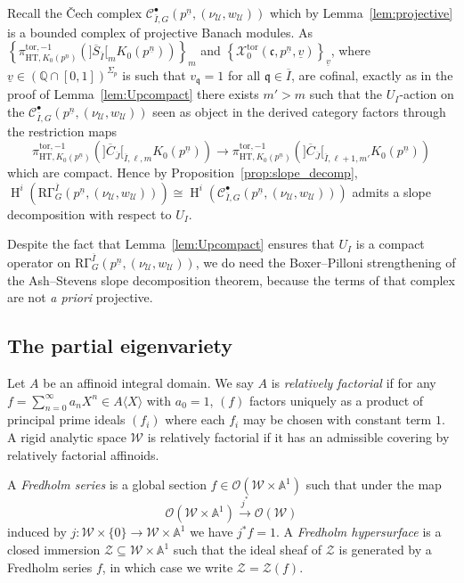 \documentclass[11pt]{amsart}
\theoremstyle{definition} %
\theoremstyle{plain} %
\theoremstyle{remark} %
\renewcommand{\AA}{\mathbb A}
\newcommand{\QQ}{{\mathbb Q}}
\newcommand{\cC}{{\mathcal C}}
\newcommand{\cO}{{\mathcal O}}
\newcommand{\cU}{{\mathcal U}}
\newcommand{\cX}{{\mathcal X}}
\newcommand{\cZ}{{\mathcal Z}}
\newcommand{\frakc}{\mathfrak c}
\newcommand{\frakq}{\mathfrak q}
\newcommand{\sW}{\mathscr W}
\newcommand{\HT}{\mathrm{HT}}
\newcommand{\isom}{\cong} %
\newcommand{\tor}{\mathrm{tor}} %
\newcommand{\RG}{\mathrm{R\Gamma}}
\DeclareMathOperator\rH{H}
\begin{document}
 Recall the \v{C}ech complex $\cC_{\overline{I},G}^{\bullet}(p^{\underline{n}}, (\nu_\cU,w_\cU))$ which by Lemma~\ref{lem:projective} is a bounded complex of projective Banach modules.
As  $\left\{\pi_{\HT, K_0(p^{\underline{n}})}^{\tor,-1}(]\overline{S}_{\overline{I}}[_m K_0(p^{\underline{n}}))\right\}_m$ and $\left\{\cX_0^\tor(\frakc,p^{\underline{n}},\underline{v})\right\}_{\underline{v}}$, where $\underline{v}\in(\QQ\cap[0,1])^{\Sigma_p}$ is such that $v_\frakq =1$ for all $\frakq\in \overline{I}$, 
   are cofinal, exactly as in the proof of  Lemma~\ref{lem:Upcompact} there exists $m'>m$ such that the $U_I$-action on the  $\cC_{\overline{I},G}^{\bullet}(p^{\underline{n}}, (\nu_\cU,w_\cU))$ seen as object in the derived category 
factors through the restriction maps 
\[\pi^{\tor,-1}_{\HT, K_0(p^{\underline{n}})}(]\overline{C}_{\overline{J}}[_{\overline{I},\ell,m}K_0(p^{\underline{n}}))
\to \pi^{\tor,-1}_{\HT, K_0(p^{\underline{n}})}(]\overline{C}_{\overline{J}}[_{\overline{I},\ell+1,m'}K_0(p^{\underline{n}}))
\] 
which are compact. Hence by  Proposition~\ref{prop:slope_decomp}, $\rH^i(\RG_G^{\overline{I}}(p^{\underline{n}}, (\nu_\cU,w_\cU))) \isom \rH^i(\cC_{\overline{I},G}^{\bullet}(p^{\underline{n}}, (\nu_\cU,w_\cU)))$ admits a  slope decomposition with respect to $U_I$. 

Despite the fact that Lemma~\ref{lem:Upcompact} ensures that $U_I$ is a compact operator on $\RG_G^{\overline{I}}(p^{\underline{n}},(\nu_\cU,w_\cU))$, we do need the Boxer--Pilloni strengthening of the Ash--Stevens slope decomposition theorem, because the terms of that complex are not {\it a priori} projective. 
 


\subsection{The partial eigenvariety}
Let $A$ be an affinoid integral domain.
We say $A$ is \emph{relatively factorial} if for any $f=\sum_{n=0}^\infty a_n X^n\in A\langle X\rangle$ with $a_0=1$, $(f)$ factors uniquely as a product of principal prime ideals $(f_i)$ where each $f_i$ may be chosen with constant term $1$.
A rigid analytic space $\sW$ is relatively factorial if it has an admissible covering by relatively factorial affinoids.

A \emph{Fredholm series} is a global section $f\in \cO(\sW\times \AA^1)$ such that under the map 
\[ \cO(\sW\times \AA^1)\xrightarrow{j^\ast} \cO(\sW)\]
induced by $j\colon \sW\times \{0\} \rightarrow \sW\times \AA^1$ we have $j^\ast f=1$.
A \emph{Fredholm hypersurface} is a closed immersion $\cZ\subseteq \sW\times \AA^1$ such that the ideal sheaf of $\cZ$ is generated by a Fredholm series $f$, in which case we write $\cZ = \cZ(f)$.
\end{document}
